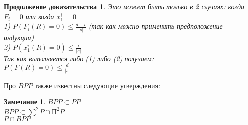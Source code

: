 \documentclass{beamer}
\theoremstyle{plain}
\newtheorem{rmk}[thm]{Замечание}
\newtheorem{proof-rus-cont}[thm]{Продолжение доказательства}
\theoremstyle{definition}
\begin{document}
\begin{frame}
    \begin{proof-rus-cont}
        Это может быть только в 2 случаях: когда $F_i = 0$ или когда $x_1^i = 0$\\
        1) $P(F_i(R)=0) \leq \frac{d-i}{|s|}$ (так как можно применить предположение индукции) \\
        2) $P(x_1^i(R) = 0) \leq \frac{i}{|s|}$\\
        Так как выполняется либо (1) либо (2) получаем:\\
        $P(F(R)=0)\leq \frac{d}{|s|}$
    \end{proof-rus-cont}
\end{frame}

\begin{frame}
    Про $BPP$ также известны следующие утверждения:
    \begin{rmk}
        $BPP \subset PP$ \\
        $BPP \subset \sum^2P \cap П^2P$ \\
        $P \cap BPP$
    \end{rmk}
\end{frame}
\end{document}
